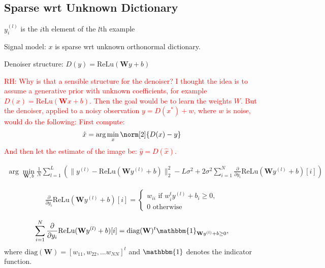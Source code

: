 \documentclass{article}
\begin{document}
\subsection{Sparse wrt Unknown Dictionary}

$y_i^{(l)}$ is the $i$th element of the $l$th example

Signal model: $x$ is sparse wrt unknown orthonormal dictionary.

Denoiser structure: $D(y)=\text{ReLu}(\mathbf{W}y+b)$


\textcolor{red}{
RH: Why is that a sensible structure for the denoiser? I thought the idea is to assume a generative prior with unknown coefficients, for example $D(x)=\text{ReLu}(\mathbf{W}x+b)$. 
Then the goal would be to learn the weights $W$. 
But the denoiser, applied to a noisy observation $y=D(x^\ast)+w$, where $w$ is noise, would do the following:
First compute:
\[
\hat x = \arg \min_x \norm[2]{D(x) - y}
\]
And then let the estimate of the image be: $\hat y = D(\hat x)$.
}



\begin{align}
    \arg\min_{\mathbf{W},b} \frac{1}{N} \sum_{l=1}^{L}
    \left(
    \|y^{(l)}-\text{ReLu}(\mathbf{W}y^{(l)}+b)\|_2^2-L\sigma^2+2\sigma^2\sum_{i=1}^{N}\frac{\partial}{\partial y_i}\text{ReLu}(\mathbf{W}y^{(l)}+b)[i] \right)
\end{align}

\begin{align}
\frac{\partial}{\partial y_i}\text{ReLu}(\mathbf{W}y^{(l)}+b)[i]=
    \begin{cases}
        w_{ii}\text{ if }w_i^ty^{(l)}+b_i\geq0,\\
        0\text{ otherwise}
    \end{cases}
\end{align}

\begin{align}
\sum_{i=1}^{N}\frac{\partial}{\partial y_i}\text{ReLu}(\mathbf{W}y^{(l)}+b)[i]=
\text{diag}(\mathbf{W})^t\mathbbm{1}_{\mathbf{W}y^{(l)}+b\geq0},
\end{align}
where $\text{diag}(\mathbf{W})=[w_{11},w_{22},...w_{NN}]^t$ and  $\mathbbm{1}$ denotes the indicator function.
\end{document}
